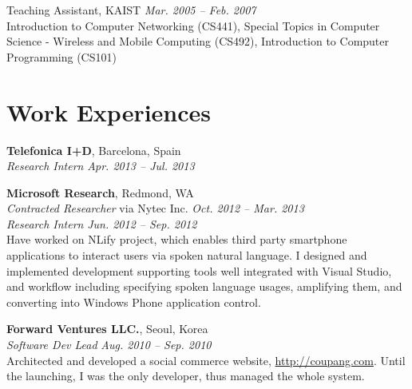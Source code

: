 \documentclass[margin,line]{res}
\begin{document}
\begin{resume}
Teaching Assistant, KAIST \hfill{\it Mar. 2005 -- Feb. 2007} \\
Introduction to Computer Networking (CS441), Special Topics in Computer Science - Wireless and Mobile Computing (CS492), Introduction to Computer Programming (CS101)


\section{\sc Work Experiences}
{\bf Telefonica I+D}, Barcelona, Spain \\
{\em Research Intern} \hfill {\it Apr. 2013 -- Jul. 2013}

{\bf Microsoft Research}, Redmond, WA \\
{\em Contracted Researcher} via Nytec Inc. \hfill {\it Oct. 2012 -- Mar. 2013} \\
{\em Research Intern} \hfill {\it Jun. 2012 -- Sep. 2012} \\
Have worked on NLify project, which enables third party smartphone applications to
interact users via spoken natural language. I designed and implemented
development supporting tools well integrated with Visual Studio, and workflow
including specifying spoken language usages, amplifying them, and converting
into Windows Phone application control.

{\bf Forward Ventures LLC.}, Seoul, Korea \\
{\em Software Dev Lead} \hfill {\it Aug. 2010 -- Sep. 2010} \\
Architected and developed a social commerce website,
\url{http://coupang.com}. Until the launching, I was the only developer, thus managed 
the whole system.


\end{resume}
\end{document}
